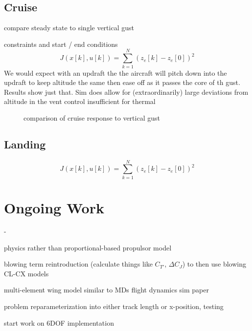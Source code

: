 \documentclass[]{article}
\begin{document}
	\subsection{Cruise}
	compare steady state to single vertical gust
	
	constraints and start / end conditions
	\begin{equation}
		J(x[k],u[k]) = \sum_{k=1}^N \left( z_e[k] -z_e[0] \right)^2
	\end{equation}
	We would expect with an updraft the the aircraft will pitch down into the updraft to keep altitude the same then ease off as it passes the core of th gust. Results show just that. Sim does allow for (extraordinarily) large deviations from altitude in the vent control insufficient for thermal
	
	\begin{figure}
		\centering
		\caption{comparison of cruise response to vertical gust} \label{fig:cruise-results}
	\end{figure}
	
	
	\subsection{Landing}
		\begin{equation}
			J(x[k],u[k]) = \sum_{k=1}^N \left( z_e[k] -z_e[0] \right)^2
		\end{equation}
	\section{Ongoing Work}
	
	\begin{list}{-}{}
		\item physics rather than proportional-based propulsor model\\
		\item blowing term reintroduction (calculate things like $C_{T'}$, $\Delta C_J$) to then use blowing CL-CX models
		\item multi-element wing model similar to MDs flight dynamics sim paper
		\item problem reparameterization into either track length or x-position, testing
		\item start work on 6DOF implementation
	\end{list}
	
	
	
	
	
\end{document}
